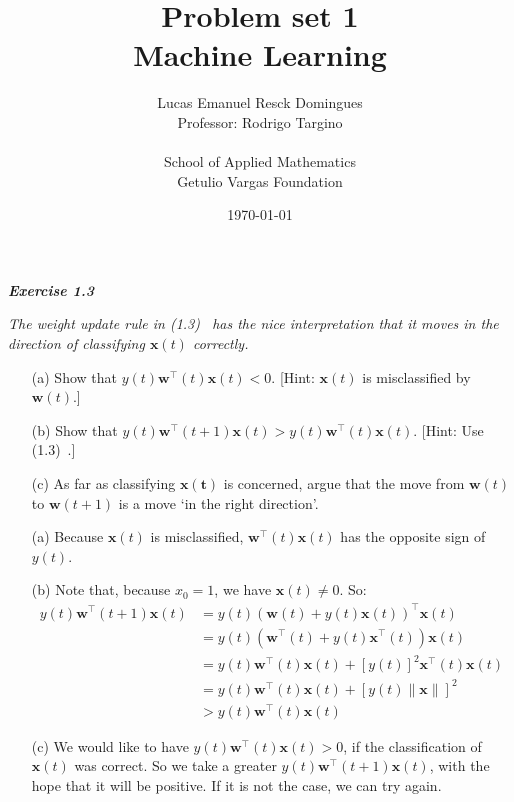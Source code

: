 \documentclass{article}
\title{Problem set 1\\
    \large{Machine Learning}}
\author{Lucas Emanuel Resck Domingues\\    
    Professor: Rodrigo Targino\\\\
    {School of Applied Mathematics}\\
    {Getulio Vargas Foundation}}
\date{\today}
\begin{document}
    \maketitle

    \noindent \textbf{\textit{Exercise 1.3}}

    \noindent \textit{The weight update rule in (1.3)~\cite{yaser2012learning} has the nice interpretation that it moves in the direction of classifying $\mathbf{x}(t)$ correctly.}
    \begin{itemize}[before=\itshape]
        \item[(a)] Show that $y(t) \mathbf{w}^\intercal(t) \mathbf{x}(t) < 0$. [Hint: $\mathbf{x}(t)$ is misclassified by $\mathbf{w}(t)$.]
        \item[(b)] Show that $y(t) \mathbf{w}^\intercal(t + 1) \mathbf{x}(t) > y(t) \mathbf{w}^\intercal(t) \mathbf{x}(t)$. [Hint: Use (1.3)~\cite{yaser2012learning}.]
        \item[(c)] As far as classifying $\mathbf{x(t)}$ is concerned, argue that the move from $\mathbf{w}(t)$ to $\mathbf{w}(t + 1)$ is a move `in the right direction'.
    \end{itemize}

    \begin{itemize}
        \item[(a)] Because $\mathbf{x}(t)$ is misclassified, $\mathbf{w}^\intercal(t) \mathbf{x}(t)$ has the opposite sign of $y(t)$.
        \item[(b)] Note that, because $x_0 = 1$, we have $\mathbf{x}(t) \ne 0$.
            So:
            \begin{align*}
                y(t) \mathbf{w}^\intercal(t + 1) \mathbf{x}(t) &= y(t) (\mathbf{w}(t) + y(t) \mathbf{x}(t))^\intercal \mathbf{x}(t) \\
                &= y(t) (\mathbf{w}^\intercal(t) + y(t) \mathbf{x}^\intercal(t)) \mathbf{x}(t) \\
                &= y(t) \mathbf{w}^\intercal(t) \mathbf{x}(t) + [y(t)]^2 \mathbf{x}^\intercal(t) \mathbf{x}(t)  \\
                &= y(t) \mathbf{w}^\intercal(t) \mathbf{x}(t) + [y(t) \lVert\mathbf{x}\lVert]^2 \\
                &> y(t) \mathbf{w}^\intercal(t) \mathbf{x}(t)
            \end{align*}
        \item[(c)] We would like to have $y(t) \mathbf{w}^\intercal(t) \mathbf{x}(t) > 0$, if the classification of $\mathbf{x}(t)$ was correct.
            So we take a greater $y(t) \mathbf{w}^\intercal(t + 1) \mathbf{x}(t)$, with the hope that it will be positive.
            If it is not the case, we can try again. \\
    \end{itemize}
\end{document}
